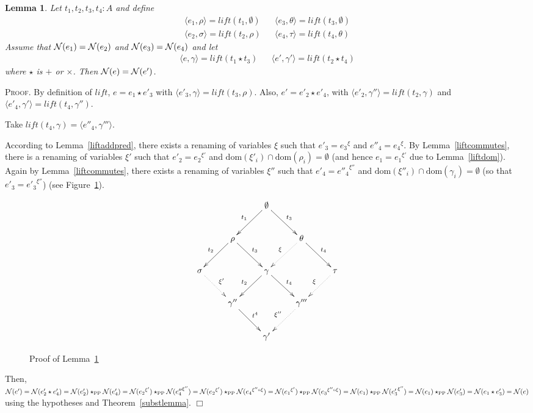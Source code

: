 \documentclass{article}
\newtheorem{lemma}[definition]{Lemma}
\newenvironment{proof}{\smallskip\textsc{Proof.}}{\hspace*{\fill}$\Box$}
\newcommand{\N}{{\cal N}}
\newcommand{\lift}{\ensuremath{\mathit{lift}}}
\newcommand{\dom}{\ensuremath{\mathrm{dom}}}
\newcommand{\renamevar}[2]{\ensuremath{{#1}^{#2}}}
\newcommand{\isrenamevar}[3]{\ensuremath{{#1}=\renamevar{#2}{#3}}}
\newcommand{\starPP}{\ensuremath{\star_{\mathrm{PP}}}}
\begin{document}
\begin{lemma}\label{set5}
Let $t_1,t_2,t_3,t_4:A$ and define
\[\begin{array}{ccc}
\langle e_1,\rho\rangle=\lift(t_1,\emptyset)
 & & \langle e_3,\theta\rangle=\lift(t_3,\emptyset) \\
\langle e_2,\sigma\rangle=\lift(t_2,\rho)
 & & \langle e_4,\tau\rangle=\lift(t_4,\theta)
\end{array}\]
Assume that $\N(e_1)=\N(e_2)$ and $\N(e_3)=\N(e_4)$ and let
\[\begin{array}{ccc}
\langle e,\gamma\rangle=\lift(t_1\star t_3)
 & & \langle e',\gamma'\rangle=\lift(t_2\star t_4)
\end{array}\]
where $\star$ is $+$ or $\times$.  Then $\N(e)=\N(e')$.
\end{lemma}
\begin{proof}
By definition of {\lift}, $e=e_1\star e'_3$ with
$\langle e'_3,\gamma\rangle=\lift(t_3,\rho)$.
Also, $e'=e'_2\star e'_4$, with
$\langle e'_2,\gamma''\rangle=\lift(t_2,\gamma)$
and $\langle e'_4,\gamma'\rangle=\lift(t_4,\gamma'')$.


Take $\lift(t_4,\gamma)=\langle e''_4,\gamma'''\rangle$.

According to Lemma~\ref{liftaddpred}, there exists a renaming of variables
$\xi$ such that {\isrenamevar{e'_3}{e_3}\xi} and
{\isrenamevar{e''_4}{e_4}\xi}.  By Lemma~\ref{liftcommutes}, there
is a renaming of variables $\xi'$ such that {\isrenamevar{e'_2}{e_2}{\xi'}}
and $\dom(\xi'_i)\cap\dom(\rho_i)=\emptyset$ (and hence
{\isrenamevar{e_1}{e_1}{\xi'}} due to Lemma~\ref{liftdom}).
Again by Lemma~\ref{liftcommutes}, there exists a renaming of
variables $\xi''$ such that {\isrenamevar{e'_4}{e''_4}{\xi''}}
and $\dom(\xi''_i)\cap\dom(\gamma_i)=\emptyset$ (so that
{\isrenamevar{e'_3}{e'_3}{\xi''}}) (see Figure~\ref{fig:set5}).
\begin{figure}
\[\xymatrix{
 & & \emptyset \ar[dl]_{t_1} \ar[dr]^{t_3} \\
 & \rho \ar[dl]_{t_2} \ar[dr]^{t_3}
 & & \theta \ar[dr]^{t_4} \ar@{.>}[dl]_{\xi} \\
 \sigma \ar@{.>}[dr]^{\xi'}
 & & \gamma \ar[dl]_{t_2} \ar[dr]^{t_4}
 & & \tau \ar@{.>}[dl]_{\xi} \\
 & \gamma'' \ar[dr]^{t^4}
 & & \gamma''' \ar@{.>}[dl]_{\xi''} \\
 & & \gamma'
}\]
\caption{Proof of Lemma~\ref{set5}}\label{fig:set5}
\end{figure}

Then,
$\N(e')%
=\N(e'_2\star e'_4)%
=\N(e'_2)\starPP\N(e'_4)%
=\N(\renamevar{e_2}{\xi'})\starPP\N(\renamevar{e''_4}{\xi''})%
=\N(\renamevar{e_2}{\xi'})\starPP\N(\renamevar{e_4}{\xi''\circ\xi})%
=\N(\renamevar{e_1}{\xi'})\starPP\N(\renamevar{e_3}{\xi''\circ\xi})%
=\N(e_1)\starPP\N(\renamevar{e'_3}{\xi''})=\N(e_1)\starPP\N(e'_3)%
=\N(e_1\star e'_3)%
=\N(e)$
using the hypotheses and Theorem~\ref{substlemma}.
\end{proof}
\end{document}
